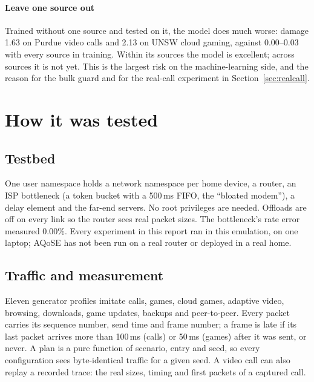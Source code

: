 \documentclass[11pt,a4paper]{article}
\begin{document}
\paragraph{Leave one source out} Trained without one source and tested on it, the model does much worse: damage 1.63 on Purdue video calls and 2.13 on UNSW cloud gaming, against 0.00--0.03 with every source in training. Within its sources the model is excellent; across sources it is not yet. This is the largest risk on the machine-learning side, and the reason for the bulk guard and for the real-call experiment in Section~\ref{sec:realcall}.

\section{How it was tested}

\subsection{Testbed}
One user namespace holds a network namespace per home device, a router, an ISP bottleneck (a token bucket with a 500\,ms FIFO, the ``bloated modem''), a delay element and the far-end servers. No root privileges are needed. Offloads are off on every link so the router sees real packet sizes. The bottleneck's rate error measured 0.00\%. Every experiment in this report ran in this emulation, on one laptop; AQoSE has not been run on a real router or deployed in a real home.

\subsection{Traffic and measurement}
Eleven generator profiles imitate calls, games, cloud games, adaptive video, browsing, downloads, game updates, backups and peer-to-peer. Every packet carries its sequence number, send time and frame number; a frame is late if its last packet arrives more than 100\,ms (calls) or 50\,ms (games) after it was sent, or never. A plan is a pure function of scenario, entry and seed, so every configuration sees byte-identical traffic for a given seed. A video call can also replay a recorded trace: the real sizes, timing and first packets of a captured call.
\end{document}
